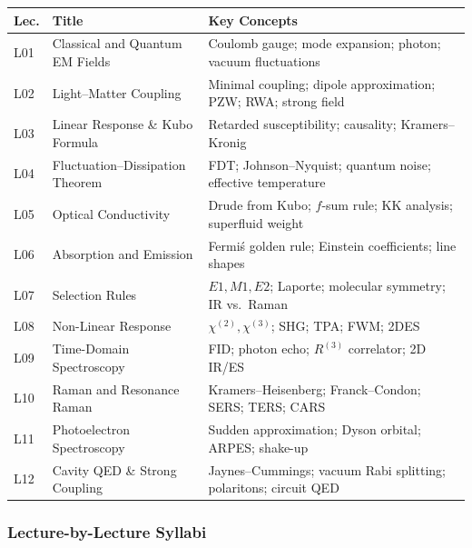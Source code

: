 \documentclass[11pt,a4paper]{article}
\begin{document}
{\footnotesize
\begin{center}
\begin{tabular}{@{}lp{4.2cm}p{6.8cm}@{}}
\toprule
\textbf{Lec.} & \textbf{Title} & \textbf{Key Concepts}\\
\midrule
L01 & Classical and Quantum EM Fields & Coulomb gauge; mode expansion; photon; vacuum fluctuations\\
L02 & Light--Matter Coupling & Minimal coupling; dipole approximation; PZW; RWA; strong field\\
L03 & Linear Response \& Kubo Formula & Retarded susceptibility; causality; Kramers--Kronig\\
L04 & Fluctuation--Dissipation Theorem & FDT; Johnson--Nyquist; quantum noise; effective temperature\\
L05 & Optical Conductivity & Drude from Kubo; $f$-sum rule; KK analysis; superfluid weight\\
L06 & Absorption and Emission & Fermi\'s golden rule; Einstein coefficients; line shapes\\
\midrule
L07 & Selection Rules & $E1,M1,E2$; Laporte; molecular symmetry; IR vs.\ Raman\\
L08 & Non-Linear Response & $\chi^{(2)},\chi^{(3)}$; SHG; TPA; FWM; 2DES\\
L09 & Time-Domain Spectroscopy & FID; photon echo; $R^{(3)}$ correlator; 2D IR/ES\\
L10 & Raman and Resonance Raman & Kramers--Heisenberg; Franck--Condon; SERS; TERS; CARS\\
L11 & Photoelectron Spectroscopy & Sudden approximation; Dyson orbital; ARPES; shake-up\\
L12 & Cavity QED \& Strong Coupling & Jaynes--Cummings; vacuum Rabi splitting; polaritons; circuit QED\\
\bottomrule
\end{tabular}
\end{center}
}

\subsubsection*{Lecture-by-Lecture Syllabi}
\end{document}
